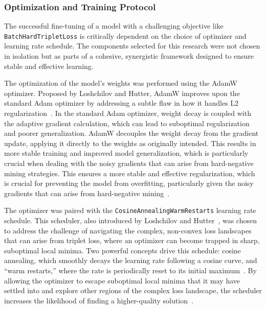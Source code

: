 \subsubsection{Optimization and Training Protocol}\label{ch:3.3.1.3}
The successful fine-tuning of a model with a challenging objective like \verb|BatchHardTripletLoss| is critically dependent on the choice of optimizer and learning rate schedule. The components selected for this research were not chosen in isolation but as parts of a cohesive, synergistic framework designed to ensure stable and effective learning.{\setlength{\emergencystretch}{5em}\par}

The optimization of the model's weights was performed using the AdamW optimizer. Proposed by Loshchilov and Hutter, AdamW improves upon the standard Adam optimizer by addressing a subtle flaw in how it handles L2 regularization~\cite{loshchilov2019decoupledweightdecayregularization}. In the standard Adam optimizer, weight decay is coupled with the adaptive gradient calculation, which can lead to suboptimal regularization and poorer generalization. AdamW decouples the weight decay from the gradient update, applying it directly to the weights as originally intended. This results in more stable training and improved model generalization, which is particularly crucial when dealing with the noisy gradients that can arise from hard-negative mining strategies.  This ensures a more stable and effective regularization, which is crucial for preventing the model from overfitting, particularly given the noisy gradients that can arise from hard-negative mining~\cite{loshchilov2019decoupledweightdecayregularization}.

The optimizer was paired with the \verb|CosineAnnealingWarmRestarts| learning rate schedule. This scheduler, also introduced by Loshchilov and Hutter~\cite{loshchilovhutter}, was chosen to address the challenge of navigating the complex, non-convex loss landscapes that can arise from triplet loss, where an optimizer can become trapped in sharp, suboptimal local minima.  Two powerful concepts drive this schedule: cosine annealing, which smoothly decays the learning rate following a cosine curve, and ``warm restarts,'' where the rate is periodically reset to its initial maximum~\cite{pytorchcosanneal}. By allowing the optimizer to escape suboptimal local minima that it may have settled into and explore other regions of the complex loss landscape, the scheduler increases the likelihood of finding a higher-quality solution~\cite{loshchilovhutter}.

